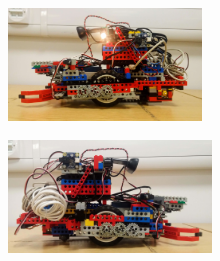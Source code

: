 \begin{figure}[ht]
    \centering
    \begin{subfigure}{0.45\textwidth}
        \includegraphics[width=\linewidth, height=3cm]{res/robot-pics/view-left-side.jpg}
        \caption{}
        \label{fig:}
    \end{subfigure}
    \begin{subfigure}{0.45\textwidth}
        \includegraphics[width=\linewidth, height=3cm]{res/robot-pics/view-right-side.jpg}
        \caption{}
        \label{fig:}
    \end{subfigure}
    \caption{}
    \label{fig:}
\end{figure}

